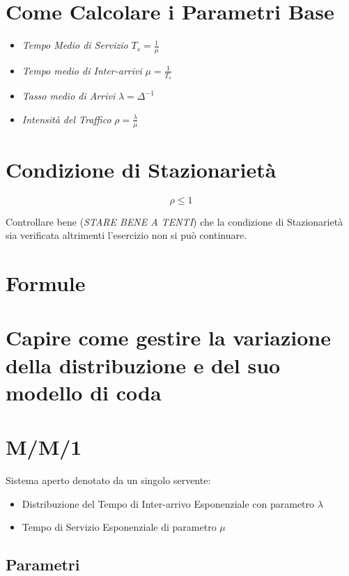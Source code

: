 \section{Come Calcolare i Parametri Base} \label{parametri-base}

\begin{itemize}
    \item \textit{Tempo Medio di Servizio} $T_s = \frac{1}{\mu}$
    \item \textit{Tempo medio di Inter-arrivi} $\mu = \frac{1}{T_s}$
    \item \textit{Tasso medio di Arrivi} $\lambda = \Delta^{-1}$
    \item \textit{Intensità del Traffico} $\rho = \frac{\lambda}{\mu}$
\end{itemize}

\section{Condizione di Stazionarietà}

$$
    \rho \le 1
$$

Controllare bene (\textit{STARE BENE A TENTI}) che la condizione di
Stazionarietà sia verificata altrimenti l'esercizio non si può continuare.

\section{Formule}


\section{Capire come gestire la variazione della distribuzione e del suo modello di coda}

\section{M/M/1}

Sistema aperto denotato da un singolo servente:

\begin{itemize}
    \item Distribuzione del Tempo di Inter-arrivo Esponenziale con parametro
          $\lambda$
    \item Tempo di Servizio Esponenziale di parametro $\mu$
\end{itemize}

\subsection{Parametri}

